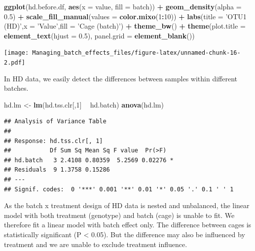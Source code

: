 \documentclass[]{book}
\newenvironment{Shaded}{\begin{snugshade}}{\end{snugshade}}
\newcommand{\KeywordTok}[1]{\textcolor[rgb]{0.13,0.29,0.53}{\textbf{#1}}}
\newcommand{\DataTypeTok}[1]{\textcolor[rgb]{0.13,0.29,0.53}{#1}}
\newcommand{\DecValTok}[1]{\textcolor[rgb]{0.00,0.00,0.81}{#1}}
\newcommand{\FloatTok}[1]{\textcolor[rgb]{0.00,0.00,0.81}{#1}}
\newcommand{\StringTok}[1]{\textcolor[rgb]{0.31,0.60,0.02}{#1}}
\newcommand{\OperatorTok}[1]{\textcolor[rgb]{0.81,0.36,0.00}{\textbf{#1}}}
\newcommand{\NormalTok}[1]{#1}
\begin{document}
\begin{Shaded}
\begin{Highlighting}[]
\KeywordTok{ggplot}\NormalTok{(hd.before.df, }\KeywordTok{aes}\NormalTok{(}\DataTypeTok{x =}\NormalTok{ value, }\DataTypeTok{fill =}\NormalTok{ batch)) }\OperatorTok{+}\StringTok{ }
\StringTok{  }\KeywordTok{geom_density}\NormalTok{(}\DataTypeTok{alpha =} \FloatTok{0.5}\NormalTok{) }\OperatorTok{+}\StringTok{ }\KeywordTok{scale_fill_manual}\NormalTok{(}\DataTypeTok{values =} \KeywordTok{color.mixo}\NormalTok{(}\DecValTok{1}\OperatorTok{:}\DecValTok{10}\NormalTok{)) }\OperatorTok{+}\StringTok{ }
\StringTok{  }\KeywordTok{labs}\NormalTok{(}\DataTypeTok{title =} \StringTok{'OTU1 (HD)'}\NormalTok{,}\DataTypeTok{x =} \StringTok{'Value'}\NormalTok{,}\DataTypeTok{fill =} \StringTok{'Cage (batch)'}\NormalTok{) }\OperatorTok{+}\StringTok{ }
\StringTok{  }\KeywordTok{theme_bw}\NormalTok{() }\OperatorTok{+}\StringTok{ }\KeywordTok{theme}\NormalTok{(}\DataTypeTok{plot.title =} \KeywordTok{element_text}\NormalTok{(}\DataTypeTok{hjust =} \FloatTok{0.5}\NormalTok{), }
                     \DataTypeTok{panel.grid =} \KeywordTok{element_blank}\NormalTok{())}
\end{Highlighting}
\end{Shaded}

\texttt{[image: Managing\_batch\_effects\_files/figure-latex/unnamed-chunk-16-2.pdf]}

In HD data, we easily detect the differences between samples within
different batches.

\begin{Shaded}
\begin{Highlighting}[]
\NormalTok{hd.lm <-}\StringTok{ }\KeywordTok{lm}\NormalTok{(hd.tss.clr[,}\DecValTok{1}\NormalTok{] }\OperatorTok{~}\StringTok{ }\NormalTok{hd.batch)}
\KeywordTok{anova}\NormalTok{(hd.lm)}
\end{Highlighting}
\end{Shaded}

\begin{verbatim}
## Analysis of Variance Table
## 
## Response: hd.tss.clr[, 1]
##           Df Sum Sq Mean Sq F value  Pr(>F)  
## hd.batch   3 2.4108 0.80359  5.2569 0.02276 *
## Residuals  9 1.3758 0.15286                  
## ---
## Signif. codes:  0 '***' 0.001 '**' 0.01 '*' 0.05 '.' 0.1 ' ' 1
\end{verbatim}

As the batch x treatment design of HD data is nested and unbalanced, the
linear model with both treatment (genotype) and batch (cage) is unable
to fit. We therefore fit a linear model with batch effect only. The
difference between cages is statistically significant (P \textless{}
0.05). But the difference may also be influenced by treatment and we are
unable to exclude treatment influence.
\end{document}
